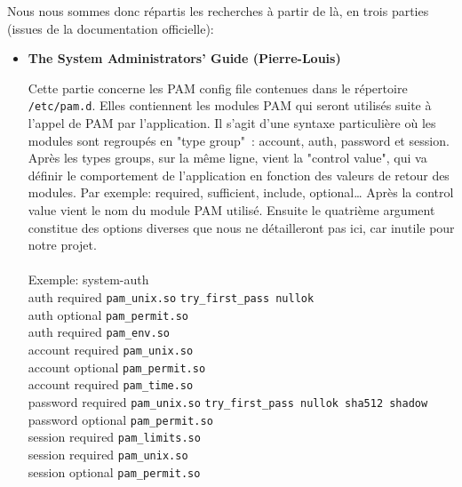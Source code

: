 \documentclass[french]{report}
\begin{document}
  Nous nous sommes donc répartis les recherches à partir de là, en trois parties
  (issues de la documentation officielle):
  \vspace{0.5cm}
  \begin{itemize}[label=\textbullet, font=\normalfont \color{blue}]
    \item{\textbf{The System Administrators' Guide (Pierre-Louis)}}

    \vspace{0.05cm}

Cette partie concerne les PAM config file contenues dans le répertoire
\verb|/etc/pam.d|. Elles contiennent les modules PAM qui seront utilisés suite à
l’appel de PAM par l’application. Il s’agit d’une syntaxe particulière où les
modules sont regroupés en "type group" : account, auth, password et session.
Après les types groups, sur la même ligne, vient la "control value", qui va
définir le comportement de l’application en fonction des valeurs de retour des
modules. Par exemple: required, sufficient, include, optional… Après la control
value vient le nom du module PAM utilisé. Ensuite le quatrième argument
constitue des options diverses que nous ne détailleront pas ici, car inutile
pour notre projet.
\\ \\
    Exemple: system-auth \\

    auth      required  \texttt{pam\_unix.so}   \texttt{try\_first\_pass
    nullok} \\
    auth      optional  \texttt{pam\_permit.so} \\
    auth      required  \texttt{pam\_env.so} \\

    account   required  \texttt{pam\_unix.so} \\
    account   optional  \texttt{pam\_permit.so} \\
    account   required  \texttt{pam\_time.so} \\
\newpage
    password  required  \texttt{pam\_unix.so}   \texttt{try\_first\_pass nullok
    sha512 shadow} \\
    password  optional  \texttt{pam\_permit.so} \\

    session   required  \texttt{pam\_limits.so} \\
    session   required  \texttt{pam\_unix.so} \\
    session   optional  \texttt{pam\_permit.so} \\


\end{itemize}
\end{document}
